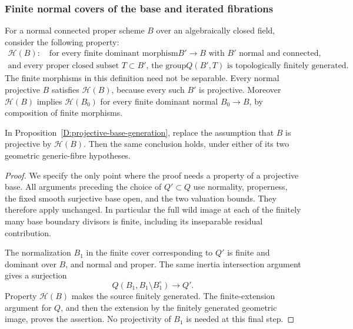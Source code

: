\subsubsection{Finite normal covers of the base and iterated fibrations}

For a normal connected proper scheme $B$ over an algebraically
closed field, consider the following property:
\[
\begin{gathered}
\mathcal H(B):\quad\text{for every finite dominant morphism
$B'\to B$ with $B'$ normal and connected,}\\
\text{and every proper closed subset $T\subset B'$, the group
$Q(B',T)$ is topologically finitely generated.}
\end{gathered}
\]
The finite morphisms in this definition need not be separable.
Every normal projective $B$ satisfies $\mathcal H(B)$, because
every such $B'$ is projective.  Moreover $\mathcal H(B)$ implies
$\mathcal H(B_0)$ for every finite dominant normal $B_0\to B$,
by composition of finite morphisms.

\begin{proposition}
\label{D:hereditary-base-generation}
In Proposition~\ref{D:projective-base-generation}, replace the
assumption that $B$ is projective by $\mathcal H(B)$.
Then the same conclusion holds, under either of its two
geometric generic-fibre hypotheses.
\end{proposition}
\begin{proof}
We specify the only point where the proof needs a property
of a projective base.  All arguments preceding the choice of
$Q'\subset Q$ use normality, properness, the fixed smooth
surjective base open, and the two valuation bounds.  They
therefore apply unchanged.  In particular the full wild
image at each of the finitely many base boundary divisors
is finite, including its inseparable residual contribution.

The normalization $B_1$ in the finite cover corresponding to
$Q'$ is finite and dominant over $B$, and normal and proper.
The same inertia intersection argument gives a surjection
\[
       Q(B_1,B_1\setminus B_1^\circ)\longrightarrow Q'.
\]
Property $\mathcal H(B)$ makes the source finitely generated.
The finite-extension argument for $Q$, and then the extension
by the finitely generated geometric image, proves the assertion.
No projectivity of $B_1$ is needed at this final step.
\end{proof}

